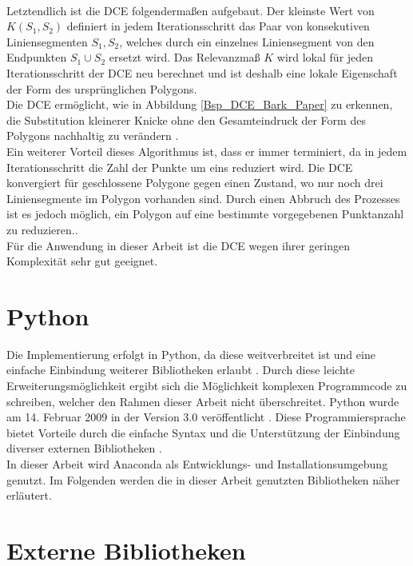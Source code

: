 { \\ 
 Letztendlich ist die DCE folgendermaßen aufgebaut. Der kleinste Wert von $K(S_1,S_2)$ definiert in jedem Iterationsschritt das Paar von konsekutiven Liniensegmenten $S_1, S_2$, welches durch ein einzelnes Liniensegment von den Endpunkten $S_1 \cup S_2$ ersetzt wird. Das Relevanzmaß $K$ wird lokal für jeden Iterationsschritt der DCE neu berechnet und ist deshalb eine lokale Eigenschaft der Form des ursprünglichen Polygons. \\ Die DCE ermöglicht, wie in Abbildung \ref{Bsp_DCE_Bark_Paper} zu erkennen, die Substitution kleinerer Knicke ohne den Gesamteindruck der Form des Polygons nachhaltig zu verändern \citep{Barkowsky2000}.
 \\
 Ein weiterer Vorteil dieses Algorithmus ist, dass er immer terminiert, da in jedem Iterationsschritt die Zahl der Punkte um eins reduziert wird. Die DCE konvergiert für geschlossene Polygone gegen einen Zustand, wo nur noch drei Liniensegmente im Polygon vorhanden sind. Durch einen Abbruch des Prozesses ist es jedoch möglich, ein Polygon auf eine bestimmte vorgegebenen Punktanzahl zu reduzieren.\citep{Barkowsky2000}.  \\ 
Für die Anwendung in dieser Arbeit ist die DCE wegen ihrer geringen Komplexität sehr gut geeignet.
}


\section{Python}
{
	Die Implementierung erfolgt in Python, da diese weitverbreitet ist und eine einfache Einbindung weiterer Bibliotheken erlaubt \citep{Millman2011}. Durch diese leichte Erweiterungsmöglichkeit ergibt sich die Möglichkeit komplexen Programmcode zu schreiben, welcher den Rahmen dieser Arbeit nicht überschreitet.
}
{ \label{sec:Python}
Python wurde am 14. Februar 2009 in der Version 3.0 veröffentlicht \citep{Rossum2009}. Diese Programmiersprache bietet Vorteile durch die einfache Syntax und die Unterstützung der Einbindung diverser externen Bibliotheken \citep{Marowka2018}. \\
In dieser Arbeit wird Anaconda als Entwicklungs- und Installationsumgebung genutzt. Im Folgenden werden die in dieser Arbeit genutzten Bibliotheken näher erläutert.}

\section{Externe Bibliotheken}
